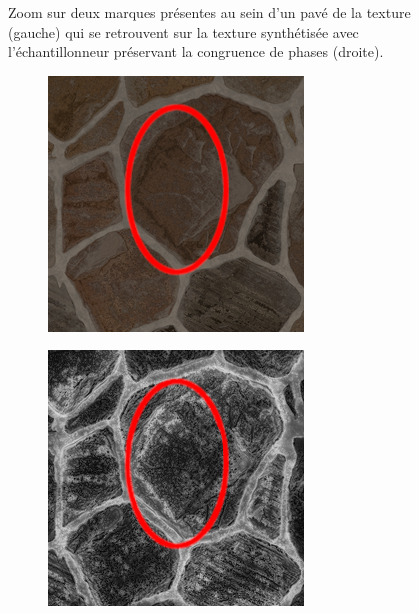 \begin{figure}
    \caption[L'échantillonneur préserve partiellement les marques dans les pavés]{Zoom sur deux marques présentes au sein d'un pavé de la texture (gauche) qui se retrouvent sur la texture synthétisée avec l'échantillonneur préservant la congruence de phases (droite).}
    \label{fig:mark-preserved}
\end{figure}

\begin{figure}
    \centering
    \begin{subfigure}{.45\textwidth}
        \centering
        \includegraphics[width=\textwidth]{contenu/resources/images/stone_zoom}
    \end{subfigure}
    \hfill
    \begin{subfigure}{.45\textwidth}
        \centering
        \includegraphics[width=\textwidth]{contenu/resources/images/stone_zoom_pc}

\end{subfigure}
\end{figure}

